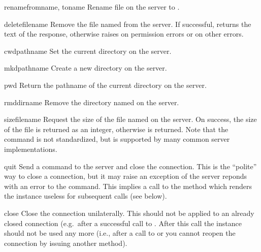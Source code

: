 \begin{methoddesc}{rename}{fromname, toname}
Rename file  on the server to .
\end{methoddesc}

\begin{methoddesc}{delete}{filename}
Remove the file named  from the server.  If successful,
returns the text of the response, otherwise raises
 on permission errors or
 on other errors.
\end{methoddesc}

\begin{methoddesc}{cwd}{pathname}
Set the current directory on the server.
\end{methoddesc}

\begin{methoddesc}{mkd}{pathname}
Create a new directory on the server.
\end{methoddesc}

\begin{methoddesc}{pwd}{}
Return the pathname of the current directory on the server.
\end{methoddesc}

\begin{methoddesc}{rmd}{dirname}
Remove the directory named  on the server.
\end{methoddesc}

\begin{methoddesc}{size}{filename}
Request the size of the file named  on the server.  On
success, the size of the file is returned as an integer, otherwise
 is returned.  Note that the  command is not 
standardized, but is supported by many common server implementations.
\end{methoddesc}

\begin{methoddesc}{quit}{}
Send a  command to the server and close the connection.
This is the ``polite'' way to close a connection, but it may raise an
exception of the server reponds with an error to the
 command.  This implies a call to the 
method which renders the  instance useless for subsequent
calls (see below).
\end{methoddesc}

\begin{methoddesc}{close}{}
Close the connection unilaterally.  This should not be applied to an
already closed connection (e.g.\ after a successful call to
.  After this call the  instance should not
be used any more (i.e., after a call to  or
 you cannot reopen the connection by issuing another
 method).
\end{methoddesc}
